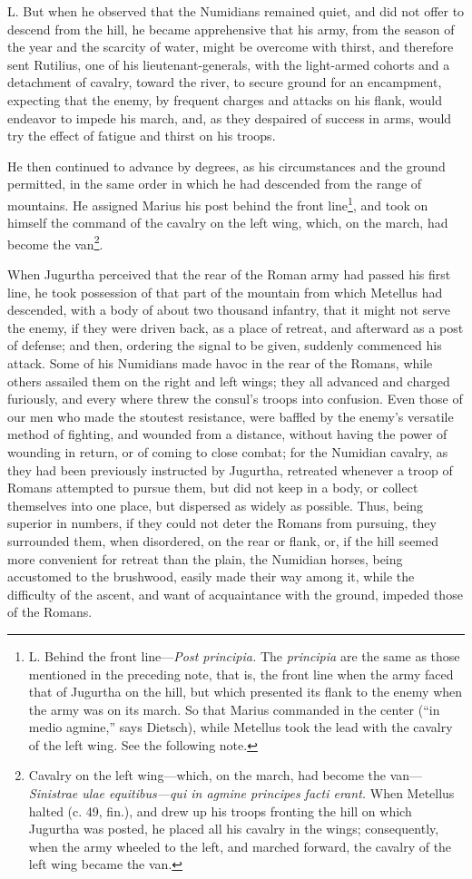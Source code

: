 L. But when he observed that the Numidians remained quiet, and did not
offer to descend from the hill, he became apprehensive that his army,
from the season of the year and the scarcity of water, might be
overcome with thirst, and therefore sent Rutilius, one of his
lieutenant-generals, with the light-armed cohorts and a detachment of
cavalry, toward the river, to secure ground for an encampment,
expecting that the enemy, by frequent charges and attacks on his
flank, would endeavor to impede his march, and, as they despaired of
success in arms, would try the effect of fatigue and thirst on his
troops.

He then continued to advance by degrees, as his circumstances and the
ground permitted, in the same order in which he had descended from the
range of mountains. He assigned Marius his post behind the front
line\footnote{L. Behind the front line—\emph{Post principia.} The \emph{principia}
are the same as those mentioned in the preceding note, that is, the
front line when the army faced that of Jugurtha on the hill, but which
presented its flank to the enemy when the army was on its march. So
that Marius commanded in the center (``in medio agmine,'' says Dietsch),
while Metellus took the lead with the cavalry of the left wing. See
the following note.}, and took on himself the command of the cavalry on the left
wing, which, on the march, had become the van\footnote{Cavalry on the left wing—which, on the march, had become
the van—\emph{Sinistrae ulae equitibus—qui in agmine principes facti
erant.} When Metellus halted (c. 49, fin.), and drew up his troops
fronting the hill on which Jugurtha was posted, he placed all his
cavalry in the wings; consequently, when the army wheeled to the left,
and marched forward, the cavalry of the left wing became the van.}.

When Jugurtha perceived that the rear of the Roman army had passed his
first line, he took possession of that part of the mountain from which
Metellus had descended, with a body of about two thousand infantry,
that it might not serve the enemy, if they were driven back, as a
place of retreat, and afterward as a post of defense; and then,
ordering the signal to be given, suddenly commenced his attack. Some
of his Numidians made havoc in the rear of the Romans, while others
assailed them on the right and left wings; they all advanced and
charged furiously, and every where threw the consul's troops into
confusion. Even those of our men who made the stoutest resistance,
were baffled by the enemy's versatile method of fighting, and wounded
from a distance, without having the power of wounding in return, or of
coming to close combat; for the Numidian cavalry, as they had been
previously instructed by Jugurtha, retreated whenever a troop of
Romans attempted to pursue them, but did not keep in a body, or
collect themselves into one place, but dispersed as widely as
possible. Thus, being superior in numbers, if they could not deter the
Romans from pursuing, they surrounded them, when disordered, on the
rear or flank, or, if the hill seemed more convenient for retreat than
the plain, the Numidian horses, being accustomed to the brushwood,
easily made their way among it, while the difficulty of the ascent,
and want of acquaintance with the ground, impeded those of the Romans.

